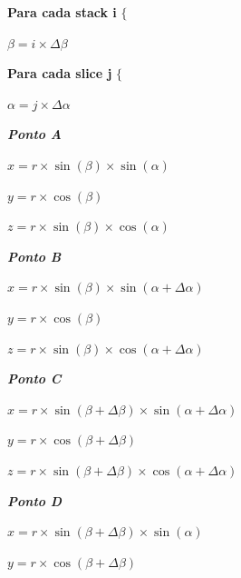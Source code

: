 \documentclass[12pt]{article}
\begin{document}
\textbf{Para cada stack i} $\{$\newline
\par $\beta = i \times \Delta\beta$ \newline
\par \textbf{Para cada slice j} $\{$ \newline
\par $\alpha = j \times \Delta\alpha$ \newline\newline
\par\textit{\textbf{Ponto A}} \newline
\par$x = r\times\sin(\beta)\times\sin(\alpha)$ \newline
\par$y = r\times\cos(\beta)$ \newline
\par$z = r\times\sin(\beta)\times\cos(\alpha)$ \newline\newline
\par\textit{\textbf{Ponto B}} \newline
\par$x = r\times\sin(\beta)\times\sin(\alpha + \Delta\alpha)$ \newline
\par$y = r\times\cos(\beta)$ \newline
\par$z = r\times\sin(\beta)\times\cos(\alpha + \Delta\alpha)$ \newline\newline
\par\textit{\textbf{Ponto C}} \newline
\par$x = r\times\sin(\beta + \Delta\beta)\times\sin(\alpha + \Delta\alpha)$ \newline
\par$y = r\times\cos(\beta + \Delta\beta)$ \newline
\par$z = r\times\sin(\beta + \Delta\beta)\times\cos(\alpha + \Delta\alpha)$ \newline\newline
\par\textit{\textbf{Ponto D}} \newline
\par$x = r\times\sin(\beta + \Delta\beta)\times\sin(\alpha)$ \newline
\par$y = r\times\cos(\beta + \Delta\beta)$ \newline
\end{document}
